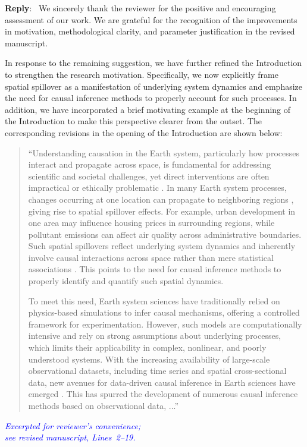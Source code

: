 \documentclass[11pt]{article}
\newcounter{reviewer}
\newcounter{point}[reviewer]
\newenvironment{reply}
   {\medskip \noindent \color{blue} \begin{sf}\textbf{Reply}:\  }
   {\medskip \par \end{sf}}
\begin{document}
\begin{reply}
We sincerely thank the reviewer for the positive and encouraging assessment of our work. We are grateful for the recognition of the improvements in motivation, methodological clarity, and parameter justification in the revised manuscript.

In response to the remaining suggestion, we have further refined the Introduction to strengthen the research motivation. Specifically, we now explicitly frame spatial spillover as a manifestation of underlying system dynamics and emphasize the need for causal inference methods to properly account for such processes. In addition, we have incorporated a brief motivating example at the beginning of the Introduction to make this perspective clearer from the outset. The corresponding revisions in the opening of the Introduction are shown below:

\vspace{1em}

\begingroup
\color{red}\itshape
\begin{quote}
    ``Understanding causation in the Earth system, particularly how processes interact and propagate across space, is fundamental for addressing scientific and societal challenges, yet direct interventions are often impractical or ethically problematic \citep{gao2022tscess,runge2023tsc,gao2023gccm}. In many Earth system processes, changes occurring at one location can propagate to neighboring regions \citep{herrera2016spatialgranger}, giving rise to spatial spillover effects. For example, urban development in one area may influence housing prices in surrounding regions, while pollutant emissions can affect air quality across administrative boundaries. Such spatial spillovers reflect underlying system dynamics and inherently involve causal interactions across space rather than mere statistical associations \citep{lyu2026tEDM}. This points to the need for causal inference methods to properly identify and quantify such spatial dynamics. 

    To meet this need, Earth system sciences have traditionally relied on physics-based simulations to infer causal mechanisms, offering a controlled framework for experimentation. However, such models are computationally intensive and rely on strong assumptions about underlying processes, which limits their applicability in complex, nonlinear, and poorly understood systems. With the increasing availability of large-scale observational datasets, including time series and spatial cross-sectional data, new avenues for data-driven causal inference in Earth sciences have emerged \citep{runge2019esstsc,runge2023tsc}. This has spurred the development of numerous causal inference methods based on observational data, ...''
\end{quote}
\endgroup

\begin{flushright}
  {\footnotesize\textit{\textcolor{blue}{Excerpted for reviewer's convenience; \\
  see revised manuscript, Lines~2--19.}}}
\end{flushright}

\vspace{1em}

\end{reply}

\baselineskip12pt
 
 
\end{document}
